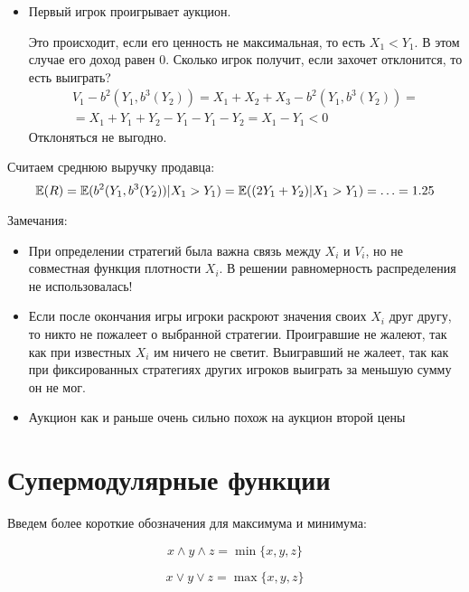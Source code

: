 \begin{myex}
\begin{itemize}
\item Первый игрок проигрывает аукцион.

Это происходит, если его ценность не максимальная, то есть $ X_{1}<Y_{1} $. В этом случае его доход равен 0. Сколько игрок получит, если захочет отклонится, то есть выиграть?
\begin{multline}
 V_{1}-b^{2}(Y_{1},b^{3}(Y_{2}))=X_{1}+X_{2}+X_{3}-b^{2}(Y_{1},b^{3}(Y_{2}))=\\
 =X_{1}+Y_{1}+Y_{2}-Y_{1}-Y_{1}-Y_{2}=X_{1}-Y_{1}<0
\end{multline}
Отклоняться не выгодно.
\end{itemize}


Считаем среднюю выручку продавца:
\begin{equation}
\mathbb{E}(R)=\mathbb{E}(b^{2}(Y_{1},b^{3}(Y_{2}))|X_{1}>Y_{1})=\mathbb{E}((2Y_{1}+Y_{2})|X_{1}>Y_{1})=\ldots=1.25
\end{equation}

Замечания:
\begin{itemize}
\item При определении стратегий была важна связь между $ X_{i} $ и $ V_{i} $, но не совместная функция плотности $ X_{i} $. В решении равномерность распределения не использовалась!
\item Если после окончания игры игроки раскроют значения своих $ X_{i} $ друг другу, то никто не пожалеет о выбранной стратегии. Проигравшие не жалеют, так как при известных $ X_{i} $ им ничего не светит. Выигравший не жалеет, так как при фиксированных стратегиях других игроков выиграть за меньшую сумму он не мог.
\item Аукцион как и раньше очень сильно похож на аукцион второй цены
\end{itemize}




\end{myex}



\section{Супермодулярные функции}

Введем более короткие обозначения для максимума и минимума:

\begin{equation}
x\wedge y\wedge z =\min\{x,y,z\}
\end{equation}

\begin{equation}
x\vee y\vee z =\max\{x,y,z\}
\end{equation}

